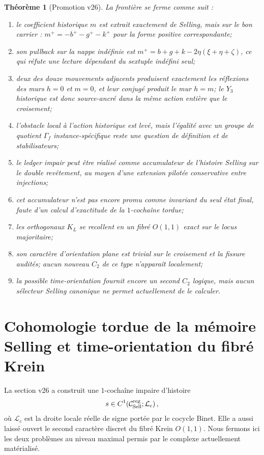 \documentclass[11pt,a4paper]{article}
\newtheorem{theorem}{Théorème}[section]
\begin{document}
\begin{theorem}[Promotion v26]\label{thm:v26-verdict}
La frontière se ferme comme suit :
\begin{enumerate}[label=\textup{(\roman*)}]
\item le coefficient historique $m$ est extrait exactement de Selling, mais sur le bon carrier : $m^+=-b^+-g^+-k^+$ pour la forme positive correspondante;
\item son pullback sur la nappe indéfinie est $m^+=b+g+k-2\eta(\xi+\eta+\zeta)$, ce qui réfute une lecture dépendant du sextuple indéfini seul;
\item deux des douze mouvements adjacents produisent exactement les réflexions des murs $h=0$ et $m=0$, et leur conjugé produit le mur $h=m$; le $Y_3$ historique est donc source-ancré dans la même action entière que le croisement;
\item l'obstacle local à l'action historique est levé, mais l'égalité avec un groupe de quotient $\Gamma_f$ instance-spécifique reste une question de définition et de stabilisateurs;
\item le ledger impair peut être réalisé comme accumulateur de l'histoire Selling sur le double revêtement, au moyen d'une extension pilotée conservative entre injections;
\item cet accumulateur n'est pas encore promu comme invariant du seul état final, faute d'un calcul d'exactitude de la $1$-cochaîne tordue;
\item les orthogonaux $K_L$ se recollent en un fibré $O(1,1)$ exact sur le locus majoritaire;
\item son caractère d'orientation plane est trivial sur le croisement et la fissure audités; aucun nouveau $C_2$ de ce type n'apparaît localement;
\item la possible time-orientation fournit encore un second $C_2$ logique, mais aucun sélecteur Selling canonique ne permet actuellement de le calculer.
\end{enumerate}
\end{theorem}


\section{Cohomologie tordue de la mémoire Selling et time-orientation du fibré Krein}\label{sec:v27-twisted-memory-time}

La section v26 a construit une $1$-cochaîne impaire d'histoire
\[
 s\in C^1\!\left(\mathcal C_{\rm Sell}^{\rm reg};\mathcal L_c\right),
\]
où $\mathcal L_c$ est la droite locale réelle de signe portée par le cocycle Binet. Elle a aussi laissé ouvert le second caractère discret du fibré Krein $O(1,1)$. Nous fermons ici les deux problèmes au niveau maximal permis par le complexe actuellement matérialisé.
\end{document}
